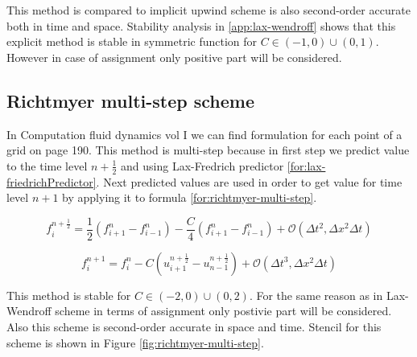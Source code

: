 			This method is compared to implicit upwind scheme is also second-order accurate both in time and space. Stability analysis in \ref{app:lax-wendroff} shows that this explicit method is stable in symmetric function for $C \in (-1, 0) \cup (0, 1)$. However in case of assignment only positive part will be considered.
			
		\subsection{Richtmyer multi-step scheme}
			In Computation fluid dynamics vol I\cite{bib:hoffman} we can find formulation for each point of a grid on page 190. This method is multi-step because in first step we predict value to the time level $n + \frac{1}{2}$ and using Lax-Fredrich predictor \ref{for:lax-friedrichPredictor}. Next predicted values are used in order to get value for time level $n+1$ by applying it to formula \ref{for:richtmyer-multi-step}.
			
			\begin{equation}
				\label{for:lax-friedrichPredictor}
				f_{i}^{n+\frac{1}{2}} = \frac{1}{2} (f_{i+1}^n - f_{i-1}^n) - \frac{C}{4}(f_{i+1}^n - f_{i-1}^n) + \mathcal{O}(\Delta t^2, \Delta x^2\Delta t)
			\end{equation}
			
			\begin{equation}
				\label{for:richtmyer-multi-step}
				f_i^{n+1} = f_i^n - C(u_{i+1}^{n+\frac{1}{2}} - u_{n-1}^{n+\frac{1}{2}}) + \mathcal{O} (\Delta t^3, \Delta x^2\Delta t)
			\end{equation}
			
			This method is stable for $C \in (-2, 0) \cup (0, 2)$. For the same reason as in Lax-Wendroff scheme in terms of assignment only postivie part will be considered. Also this scheme is second-order accurate in space and time. Stencil for this scheme is shown in Figure \ref{fig:richtmyer-multi-step}.
			

